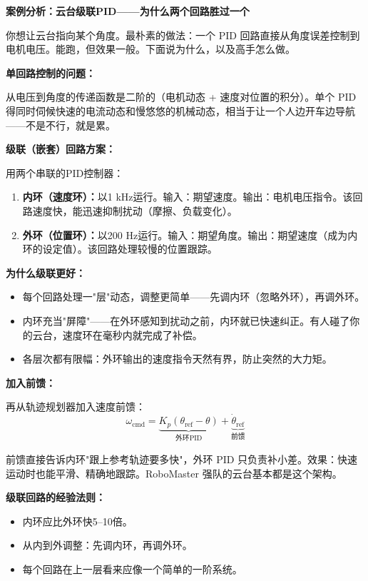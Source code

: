 \vspace{0.5em}
\begin{mdframed}[linewidth=1pt, innertopmargin=10pt, innerbottommargin=10pt]
\textbf{案例分析：云台级联PID——为什么两个回路胜过一个}

\vspace{0.3em}
你想让云台指向某个角度。最朴素的做法：一个 PID 回路直接从角度误差控制到电机电压。能跑，但效果一般。下面说为什么，以及高手怎么做。

\textbf{单回路控制的问题：}

从电压到角度的传递函数是二阶的（电机动态 + 速度对位置的积分）。单个 PID 得同时伺候快速的电流动态和慢悠悠的机械动态，相当于让一个人边开车边导航——不是不行，就是累。

\textbf{级联（嵌套）回路方案：}

用两个串联的PID控制器：
\begin{enumerate}[nosep]
    \item \textbf{内环（速度环）：}以1 kHz运行。输入：期望速度。输出：电机电压指令。该回路速度快，能迅速抑制扰动（摩擦、负载变化）。
    \item \textbf{外环（位置环）：}以200 Hz运行。输入：期望角度。输出：期望速度（成为内环的设定值）。该回路处理较慢的位置跟踪。
\end{enumerate}

\textbf{为什么级联更好：}
\begin{itemize}[nosep]
    \item 每个回路处理一"层"动态，调整更简单——先调内环（忽略外环），再调外环。
    \item 内环充当"屏障"——在外环感知到扰动之前，内环就已快速纠正。有人碰了你的云台，速度环在毫秒内就完成了补偿。
    \item 各层次都有限幅：外环输出的速度指令天然有界，防止突然的大力矩。
\end{itemize}

\textbf{加入前馈：}

再从轨迹规划器加入速度前馈：
\[
\omega_{\text{cmd}} = \underbrace{K_p(\theta_{\text{ref}} - \theta)}_{\text{外环PID}} + \underbrace{\dot{\theta}_{\text{ref}}}_{\text{前馈}}
\]

前馈直接告诉内环"跟上参考轨迹要多快"，外环 PID 只负责补小差。效果：快速运动时也能平滑、精确地跟踪。RoboMaster 强队的云台基本都是这个架构。

\textbf{级联回路的经验法则：}
\begin{itemize}[nosep]
    \item 内环应比外环快5--10倍。
    \item 从内到外调整：先调内环，再调外环。
    \item 每个回路在上一层看来应像一个简单的一阶系统。
\end{itemize}
\end{mdframed}

